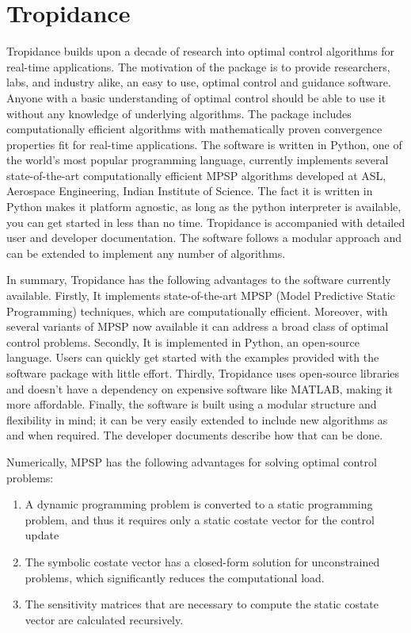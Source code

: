 \documentclass[12pt]{article}
\begin{document}
\section{Tropidance}

Tropidance builds upon a decade of research into optimal control algorithms for real-time applications. The motivation of the package is to provide researchers, labs, and industry alike, an easy to use, optimal control and guidance software. Anyone with a basic understanding of optimal control should be able to use it without any knowledge of underlying algorithms. The package includes computationally efficient algorithms with mathematically proven convergence properties fit for real-time applications. The software is written in Python, one of the world's most popular programming language, currently implements several state-of-the-art computationally efficient MPSP algorithms developed at ASL, Aerospace Engineering, Indian Institute of Science. The fact it is written in Python makes it platform agnostic, as long as the python interpreter is available, you can get started in less than no time. Tropidance is accompanied with detailed user and developer documentation. The software follows a modular approach and can be extended to implement any number of algorithms.

In summary, Tropidance has the following advantages to the software currently available. Firstly, It implements state-of-the-art MPSP (Model Predictive Static Programming) techniques, which are computationally efficient. Moreover, with several variants of MPSP now available it can address a broad class of optimal control problems. Secondly, It is implemented in Python, an open-source language. Users can quickly get started with the examples provided with the software package with little effort. Thirdly, Tropidance uses open-source libraries and doesn't have a dependency on expensive software like MATLAB, making it more affordable. Finally, the software is built using a modular structure and flexibility in mind; it can be very easily extended to include new algorithms as and when required. The developer documents describe how that can be done.

Numerically, MPSP has the following advantages for solving optimal control problems:
\begin{enumerate}
    \item A dynamic programming problem is converted to a static programming problem, and thus it requires only a static costate vector for the control update
    \item The symbolic costate vector has a closed-form solution for unconstrained problems, which significantly reduces the computational load.
    \item The sensitivity matrices that are necessary to compute the static costate vector are calculated recursively.
\end{enumerate}
\end{document}
